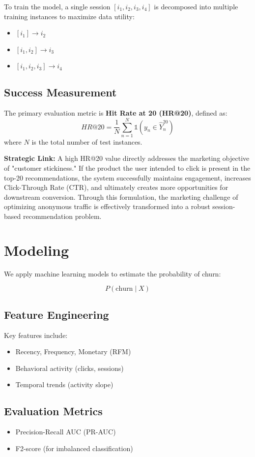 \documentclass[conference]{IEEEtran}
\begin{document}
To train the model, a single session $[i_1, i_2, i_3, i_4]$ is decomposed into multiple training instances to maximize data utility:
\begin{itemize}
    \item $[i_1] \rightarrow i_2$
    \item $[i_1, i_2] \rightarrow i_3$
    \item $[i_1, i_2, i_3] \rightarrow i_4$
\end{itemize}

\subsection{Success Measurement}
The primary evaluation metric is \textbf{Hit Rate at 20 (HR@20)}, defined as:
\[
HR@20 = \frac{1}{N}\sum_{n=1}^{N} \mathbb{1}(y_n \in \hat{Y}^{20}_n)
\]
where $N$ is the total number of test instances. 

\textbf{Strategic Link:} A high HR@20 value directly addresses the marketing objective of "customer stickiness." If the product the user intended to click is present in the top-20 recommendations, the system successfully maintains engagement, increases Click-Through Rate (CTR), and ultimately creates more opportunities for downstream conversion. Through this formulation, the marketing challenge of optimizing anonymous traffic is effectively transformed into a robust session-based recommendation problem.



\section{Modeling}
We apply machine learning models to estimate the probability of churn:

\[
P(\text{churn} \mid X)
\]

\subsection{Feature Engineering}
Key features include:
\begin{itemize}
    \item Recency, Frequency, Monetary (RFM)
    \item Behavioral activity (clicks, sessions)
    \item Temporal trends (activity slope)
\end{itemize}

\subsection{Evaluation Metrics}
\begin{itemize}
    \item Precision-Recall AUC (PR-AUC)
    \item F2-score (for imbalanced classification)
\end{itemize}
\end{document}
